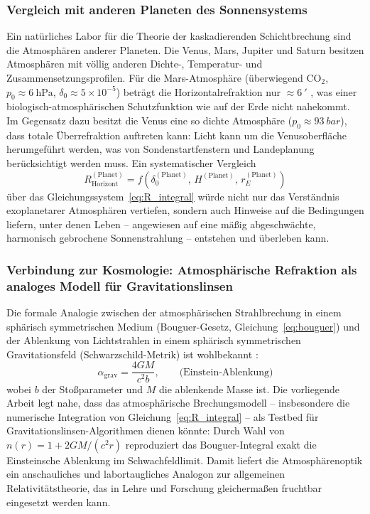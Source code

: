 ﻿\documentclass[12pt,a4paper]{article}
\begin{document}
\subsubsection{Vergleich mit anderen Planeten des Sonnensystems}

Ein natürliches Labor für die Theorie der kaskadierenden Schichtbrechung
sind die Atmosphären anderer Planeten.
Die Venus, Mars, Jupiter und Saturn besitzen Atmosphären
mit völlig anderen Dichte-, Temperatur- und Zusammensetzungsprofilen.
Für die Mars-Atmosphäre (überwiegend CO$_2$, $p_0 \approx \SI{6}{\hecto\pascal}$,
$\delta_0 \approx 5\times10^{-5}$) beträgt die Horizontalrefraktion
nur $\approx \SI{6}{\arcminute}$ \citep{Kliore1972},
was einer biologisch-atmosphärischen Schutzfunktion wie auf der Erde
nicht nahekommt.
Im Gegensatz dazu besitzt die Venus eine so dichte Atmosphäre
($p_0 \approx \SI{93}{bar}$), dass totale Überrefraktion auftreten kann:
Licht kann um die Venusoberfläche herumgeführt werden,
was von Sondenstartfenstern und Landeplanung berücksichtigt werden muss.
Ein systematischer Vergleich
\begin{equation}
  R_{\mathrm{Horizont}}^{(\mathrm{Planet})}
  = f\!\left(\delta_0^{(\mathrm{Planet})},\, H^{(\mathrm{Planet})},\,
             r_E^{(\mathrm{Planet})}\right)
  \label{eq:R_planeten}
\end{equation}
über das Gleichungssystem~\eqref{eq:R_integral} würde nicht nur das
Verständnis exoplanetarer Atmosphären vertiefen,
sondern auch Hinweise auf die Bedingungen liefern,
unter denen Leben -- angewiesen auf eine mäßig abgeschwächte,
harmonisch gebrochene Sonnenstrahlung -- entstehen und überleben kann.

\subsubsection{Verbindung zur Kosmologie: Atmosphärische Refraktion
               als analoges Modell für Gravitationslinsen}

Die formale Analogie zwischen der atmosphärischen Strahlbrechung
in einem sphärisch symmetrischen Medium (Bouguer-Gesetz,
Gleichung~\ref{eq:bouguer}) und der Ablenkung von Lichtstrahlen
in einem sphärisch symmetrischen Gravitationsfeld
(Schwarzschild-Metrik) ist wohlbekannt \citep{SchneiderEhlers1992}:
\begin{equation}
  \alpha_{\mathrm{grav}} = \frac{4GM}{c^2 b},
  \qquad \text{(Einstein-Ablenkung)}
  \label{eq:einstein}
\end{equation}
wobei $b$ der Stoßparameter und $M$ die ablenkende Masse ist.
Die vorliegende Arbeit legt nahe, dass das atmosphärische
Brechungsmodell -- insbesondere die numerische Integration
von Gleichung~\eqref{eq:R_integral} -- als Testbed für
Gravitationslinsen-Algorithmen dienen könnte:
Durch Wahl von $n(r) = 1 + 2GM/(c^2 r)$ reproduziert das
Bouguer-Integral exakt die Einsteinsche Ablenkung im Schwachfeldlimit.
Damit liefert die Atmosphärenoptik ein anschauliches und labortaugliches
Analogon zur allgemeinen Relativitätstheorie, das in
Lehre und Forschung gleichermaßen fruchtbar eingesetzt werden kann.
\end{document}
